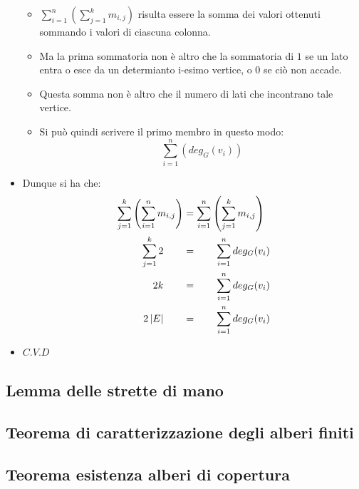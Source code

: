 \documentclass[10pt]{article}
\begin{document}
\begin{itemize}
\begin{itemize}
\item
$\displaystyle{\sum_{i = 1}^{n} \left(\sum_{j = 1}^{k} m_{i,j}\right)}$ risulta essere la somma dei valori ottenuti sommando i valori di ciascuna colonna.
\item
Ma la prima sommatoria non è altro che la sommatoria di $1$ se un lato entra o esce da un determianto i-esimo vertice, o $0$ se ciò non accade.
\item
Questa somma non è altro che il numero di lati che incontrano tale vertice.
\item
Si può quindi scrivere il primo membro in questo modo:
$$\displaystyle{\sum_{i = 1}^{n} \left(deg_G (v_i)\right)}$$
\end{itemize}
\item
Dunque si ha che:
\begin{equation}
\begin{split}
\sum_{j = 1}^{k} \left(\sum_{i = 1}^{n} m_{i,j} \right) &= \sum_{i = 1}^{n} \left(\sum_{j = 1}^{k} m_{i,j} \right) \\
\sum_{j = 1}^{k} 2 \quad \quad &= \quad \quad \sum_{i = 1}^{n} deg_G (v_i)\\
2k \quad \quad &= \quad \quad \sum_{i = 1}^{n} deg_G (v_i) \\
2\,|E| \quad \quad &= \quad \quad \sum_{i = 1}^{n} deg_G (v_i)
\notag
\end{split}
\end{equation}
\item
$C.V.D$
\end{itemize}
\subsection{Lemma delle strette di mano}
\subsection{Teorema di caratterizzazione degli alberi finiti}
\subsection{Teorema esistenza alberi di copertura}
\end{document}
